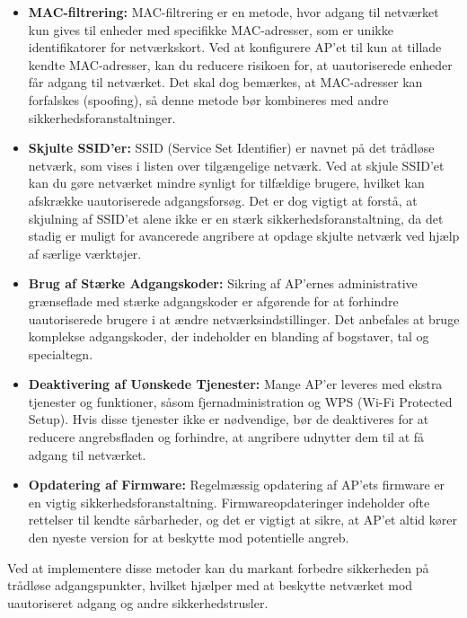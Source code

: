 \begin{itemize}
	\item \textbf{MAC-filtrering:} MAC-filtrering er en metode, hvor adgang til netværket kun gives til enheder med specifikke MAC-adresser, som er unikke identifikatorer for netværkskort. Ved at konfigurere AP'et til kun at tillade kendte MAC-adresser, kan du reducere risikoen for, at uautoriserede enheder får adgang til netværket. Det skal dog bemærkes, at MAC-adresser kan forfalskes (spoofing), så denne metode bør kombineres med andre sikkerhedsforanstaltninger.
	
	\item \textbf{Skjulte SSID'er:} SSID (Service Set Identifier) er navnet på det trådløse netværk, som vises i listen over tilgængelige netværk. Ved at skjule SSID'et kan du gøre netværket mindre synligt for tilfældige brugere, hvilket kan afskrække uautoriserede adgangsforsøg. Det er dog vigtigt at forstå, at skjulning af SSID'et alene ikke er en stærk sikkerhedsforanstaltning, da det stadig er muligt for avancerede angribere at opdage skjulte netværk ved hjælp af særlige værktøjer.
	
	\item \textbf{Brug af Stærke Adgangskoder:} Sikring af AP'ernes administrative grænseflade med stærke adgangskoder er afgørende for at forhindre uautoriserede brugere i at ændre netværksindstillinger. Det anbefales at bruge komplekse adgangskoder, der indeholder en blanding af bogstaver, tal og specialtegn.
	
	\item \textbf{Deaktivering af Uønskede Tjenester:} Mange AP'er leveres med ekstra tjenester og funktioner, såsom fjernadministration og WPS (Wi-Fi Protected Setup). Hvis disse tjenester ikke er nødvendige, bør de deaktiveres for at reducere angrebsfladen og forhindre, at angribere udnytter dem til at få adgang til netværket.
	
	\item \textbf{Opdatering af Firmware:} Regelmæssig opdatering af AP'ets firmware er en vigtig sikkerhedsforanstaltning. Firmwareopdateringer indeholder ofte rettelser til kendte sårbarheder, og det er vigtigt at sikre, at AP'et altid kører den nyeste version for at beskytte mod potentielle angreb.
\end{itemize}
\noindent
Ved at implementere disse metoder kan du markant forbedre sikkerheden på trådløse adgangspunkter, hvilket hjælper med at beskytte netværket mod uautoriseret adgang og andre sikkerhedstrusler.


